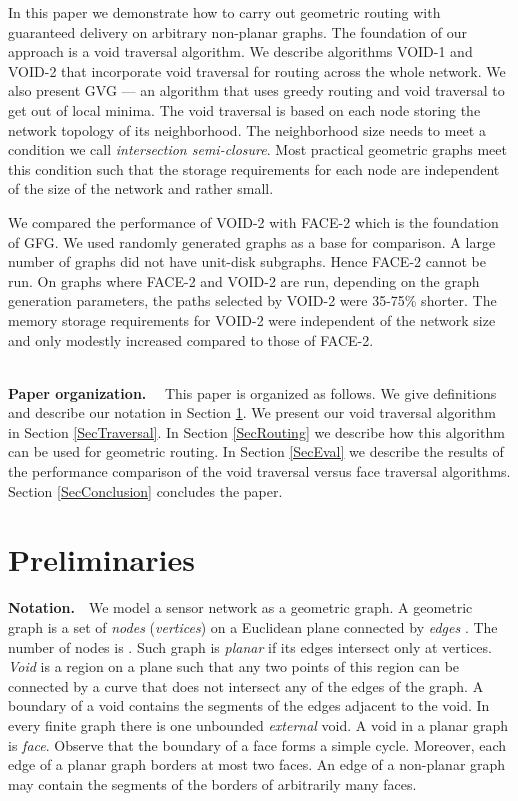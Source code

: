 \documentclass[conference]{IEEEtran}
\begin{document}
In this paper we demonstrate how to carry out geometric routing with
guaranteed delivery on arbitrary non-planar graphs. The foundation of
our approach is a void traversal algorithm. We describe algorithms
VOID-1 and VOID-2 that incorporate void traversal for routing across
the whole network. We also present GVG --- an algorithm that uses
greedy routing and void traversal to get out of local minima.  The
void traversal is based on each node storing the network topology of
its neighborhood. The neighborhood size needs to meet a condition we
call \emph{intersection semi-closure}.  Most practical geometric
graphs meet this condition such that the storage requirements for each
node are independent of the size of the network and rather small.

We compared the performance of VOID-2 with FACE-2 which is the
foundation of GFG. We used randomly generated graphs as a base for
comparison. A large number of graphs did not have unit-disk subgraphs.
Hence FACE-2 cannot be run. On graphs where FACE-2 and VOID-2 are run,
depending on the graph generation parameters, the paths selected by
VOID-2 were 35-75\% shorter. The memory storage requirements for
VOID-2 were independent of the network size and only modestly
increased compared to those of FACE-2.


\ \\ \textbf{Paper organization.} \ \ This paper is organized as
follows. We give definitions and describe our notation in Section
\ref{SecPrelim}. We present our void traversal algorithm in Section
\ref{SecTraversal}. In Section \ref{SecRouting} we describe how this
algorithm can be used for geometric routing. In Section \ref{SecEval}
we describe the results of the performance comparison of the void
traversal versus face traversal algorithms.  Section
\ref{SecConclusion} concludes the paper.


\section{Preliminaries} 
\label{SecPrelim}

\noindent
\textbf{Notation.}\ \ We model a sensor network as a geometric graph.
A geometric graph  is a set of \emph{nodes}
(\emph{vertices})  on a Euclidean plane connected by \emph{edges}
. The number of nodes is . Such graph is \emph{planar} if
its edges intersect only at vertices. \emph{Void} is a region on a
plane such that any two points of this region can be connected by a
curve that does not intersect any of the edges of the graph. A
boundary of a void contains the segments of the edges adjacent to the
void. In every finite graph there is one unbounded \emph{external}
void.  A void in a planar graph is \emph{face}. Observe that the
boundary of a face forms a simple cycle. Moreover, each edge of a
planar graph borders at most two faces. An edge of a non-planar graph
may contain the segments of the borders of arbitrarily many faces.
\end{document}
